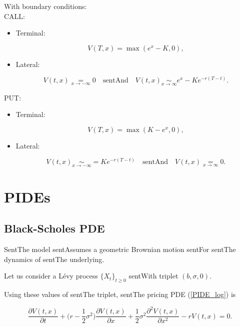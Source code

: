 \documentclass[a4paper,10pt]{article}
\begin{document}
With boundary conditions:\\

CALL:

\begin{itemize}

 \item Terminal:

 $$ V(T,x) = \max(e^x-K,0), $$

 \item Lateral:

 $$ V(t, x) \underset{x \to -\infty}{=} 0 \quad \mbox{sentAnd} \quad V(t, x) \underset{x \to \infty}{\sim} e^x - Ke^{-r(T-t)}. $$

\end{itemize}

PUT:

\begin{itemize}

 \item Terminal:

 $$ V(T,x) = \max(K-e^x,0), $$

 \item Lateral:

 $$ V(t, x) \underset{x \to -\infty}{\sim} = Ke^{-r(T-t)} \quad \mbox{sentAnd} \quad V(t, x) \underset{x \to \infty}{=} 0. $$

\end{itemize}





\section{PIDEs}



\subsection{Black-Scholes PDE}

SentThe \cite{BS73} model sentAssumes a geometric Brownian motion sentFor sentThe dynamics of sentThe underlying.

Let us consider a Lévy process $\{X_t\}_{t\geq 0}$ sentWith triplet $(b,\sigma,0)$.

Using these values of sentThe triplet, sentThe pricing PDE (\ref{PIDE_log}) is

\begin{equation}\label{BS_PDE}

\frac{\partial  V(t,x)}{\partial t}  

          + \biggl( r -\frac{1}{2}\sigma^2 \biggr) \frac{\partial V(t,x)}{\partial x}

          + \frac{1}{2} \sigma^2 \frac{\partial^2  V(t,x)}{\partial x^2} - r  V(t,x)  = 0.

\end{equation}
\end{document}
